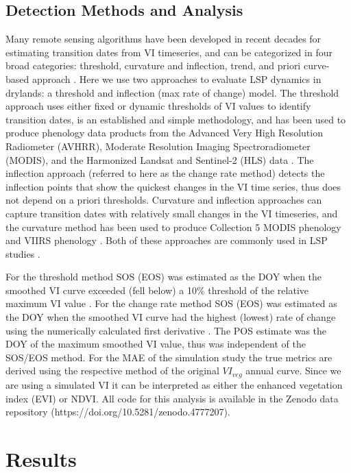 \documentclass{article}
\begin{document}
\subsection{Detection Methods and Analysis}
Many remote sensing algorithms have been developed in recent decades for estimating transition dates from VI timeseries, and can be categorized in four broad categories: threshold, curvature and inflection, trend, and priori curve-based approach \cite{gao-zhang2021, zeng-wardlow2020}. Here we use two approaches to evaluate LSP dynamics in drylands: a threshold and inflection (max rate of change) model. The threshold approach uses either fixed or dynamic thresholds of VI values to identify transition dates, is an established and simple methodology, and has been used to produce phenology data products from the Advanced Very High Resolution Radiometer (AVHRR), Moderate Resolution Imaging Spectroradiometer (MODIS), and the Harmonized Landsat and Sentinel-2 (HLS) data \cite{jonsson2004, gray2019, bolton2020}. The inflection approach (referred to here as the change rate method) detects the inflection points that show the quickest changes in the VI time series, thus does not depend on a priori thresholds. Curvature and inflection approaches can capture transition dates with relatively small changes in the VI timeseries, and the curvature method has been used to produce Collection 5 MODIS phenology and VIIRS phenology \cite{zhang-friedl2003, zhang-liu2018}. Both of these approaches are commonly used in LSP studies \cite{garonna2016, jeong2011, buitenwerf2015}. 

For the threshold method SOS (EOS) was estimated as the DOY when the smoothed VI curve exceeded (fell below) a 10\% threshold of the relative maximum VI value \cite{white2007}. For the change rate method SOS (EOS) was estimated as the DOY when the smoothed VI curve had the highest (lowest) rate of change using the numerically calculated first derivative \cite{tateishi2004}. The POS estimate was the DOY of the maximum smoothed VI value, thus was independent of the SOS/EOS method. For the MAE of the simulation study the true metrics are derived using the respective method of the original $VI_{veg}$ annual curve. Since we are using a simulated VI it can be interpreted as either the enhanced vegetation index (EVI) or NDVI. All code for this analysis is available in the Zenodo data repository (https://doi.org/10.5281/zenodo.4777207).


\section{Results}
\end{document}
